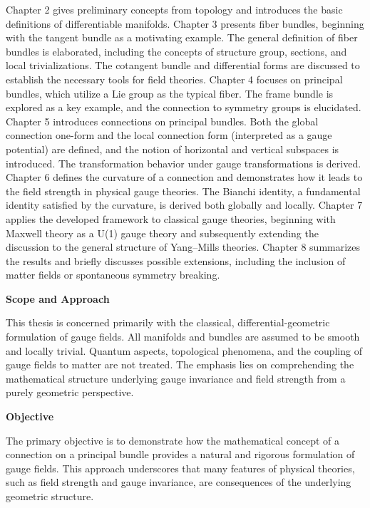 Chapter 2 gives preliminary concepts from topology and introduces the basic definitions of differentiable manifolds. Chapter 3 presents fiber bundles, beginning with the tangent bundle as a motivating example. The general definition of fiber bundles is elaborated, including the concepts of structure group, sections, and local trivializations. The cotangent bundle and differential forms are discussed to establish the necessary tools for field theories. Chapter 4 focuses on principal bundles, which utilize a Lie group as the typical fiber. The frame bundle is explored as a key example, and the connection to symmetry groups is elucidated. Chapter 5 introduces connections on principal bundles. Both the global connection one-form and the local connection form (interpreted as a gauge potential) are defined, and the notion of horizontal and vertical subspaces is introduced. The transformation behavior under gauge transformations is derived. Chapter 6 defines the curvature of a connection and demonstrates how it leads to the field strength in physical gauge theories. The Bianchi identity, a fundamental identity satisfied by the curvature, is derived both globally and locally. Chapter 7 applies the developed framework to classical gauge theories, beginning with Maxwell theory as a U(1) gauge theory and subsequently extending the discussion to the general structure of Yang–Mills theories. Chapter 8 summarizes the results and briefly discusses possible extensions, including the inclusion of matter fields or spontaneous symmetry breaking. 

\textbf{Scope and Approach}

This thesis is concerned primarily with the classical, differential-geometric formulation of gauge fields. All manifolds and bundles are assumed to be smooth and locally trivial. Quantum aspects, topological phenomena, and the coupling of gauge fields to matter are not treated. The emphasis lies on comprehending the mathematical structure underlying gauge invariance and field strength from a purely geometric perspective. 

\textbf{Objective}

The primary objective is to demonstrate how the mathematical concept of a connection on a principal bundle provides a natural and rigorous formulation of gauge fields. This approach underscores that many features of physical theories, such as field strength and gauge invariance, are consequences of the underlying geometric structure.
